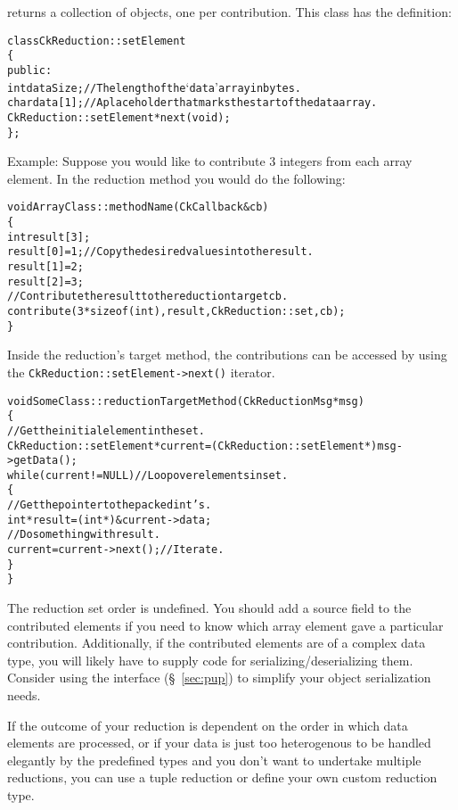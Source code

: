  returns a collection of 
objects, one per contribution.  This class has the definition:

\begin{alltt}
class CkReduction::setElement 
\{
public:
  int dataSize; //The length of the `data' array in bytes.
  char data[1]; //A place holder that marks the start of the data array.
  CkReduction::setElement *next(void);
\};
\end{alltt}

Example: Suppose you would like to contribute 3 integers from each array
element. In the reduction method you would do the following:

\begin{alltt}
void ArrayClass::methodName (CkCallback &cb)
\{
  int result[3];
  result[0] = 1;            // Copy the desired values into the result.
  result[1] = 2;
  result[2] = 3;
  // Contribute the result to the reductiontarget cb.
  contribute(3*sizeof(int), result, CkReduction::set, cb);
\}
\end{alltt}

Inside the reduction's target method, the contributions can be accessed by using
the \texttt{CkReduction::setElement->next()} iterator.

\begin{alltt}
void SomeClass::reductionTargetMethod (CkReductionMsg *msg)
\{
  // Get the initial element in the set.
  CkReduction::setElement *current = (CkReduction::setElement*) msg->getData();
  while(current != NULL) // Loop over elements in set.
  \{
    // Get the pointer to the packed int's.
    int *result = (int*) &current->data;
    // Do something with result.
    current = current->next(); // Iterate.
  \}
\}
\end{alltt}

The reduction set order is undefined.  You should add a source field to the
contributed elements if you need to know which array element gave a particular
contribution.  Additionally, if the contributed elements are of a complex 
data type, you will likely have to supply code for 
serializing/deserializing them.
Consider using the 
interface (\S~\ref{sec:pup}) to simplify your object serialization
needs.

If the outcome of your reduction is dependent on the order in which 
data elements are processed, or if your data is just too
heterogenous to be handled elegantly by the predefined types and you
don't want to undertake multiple reductions, you can use a tuple
reduction or define your own custom reduction type.

